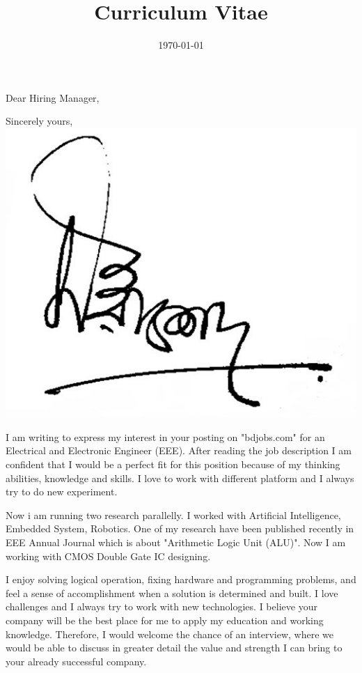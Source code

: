 \documentclass[11pt,a4paper,sans]{moderncv}        %
\title{Curriculum Vitae}                               %
\begin{document}



\clearpage

\date{\today} %
\opening{Dear Hiring Manager,} %
\closing{Sincerely yours,\\ \includegraphics[width=0.2\linewidth]{signature.jpg}} %

\makelettertitle %

I am writing to express my interest in your posting on "bdjobs.com" for an Electrical and Electronic Engineer (EEE). After reading the job description I am confident that I would be a perfect fit for this position because of my thinking abilities, knowledge and skills. I love to work with different platform and I always try to do new experiment. 

Now i am running two research parallelly. I worked with Artificial Intelligence, Embedded System, Robotics. One of my research have been published recently in EEE Annual Journal which is about "Arithmetic Logic Unit (ALU)". Now I am working with CMOS Double Gate IC designing.

I enjoy solving logical operation, fixing hardware and programming problems, and feel a sense of accomplishment when a solution is determined and built. I love challenges and I always try to work with new technologies. I believe your company will be the best place for me to apply my education and working knowledge.
Therefore, I would welcome the chance of an interview, where we would be able to discuss in greater detail the value and strength I can bring to your already successful company.
\end{document}
